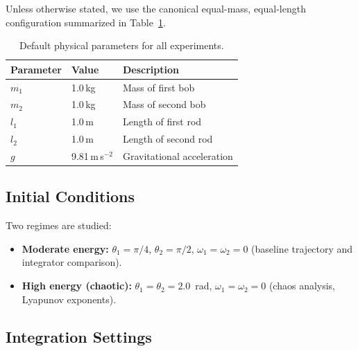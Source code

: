 \documentclass[11pt,a4paper]{article}
\begin{document}
Unless otherwise stated, we use the canonical equal-mass, equal-length
configuration summarized in Table~\ref{tab:params}.

\begin{table}[htbp]
\centering
\caption{Default physical parameters for all experiments.}
\label{tab:params}
\begin{tabular}{@{}lll@{}}
\toprule
\textbf{Parameter} & \textbf{Value} & \textbf{Description} \\
\midrule
$m_1$  & 1.0\,kg         & Mass of first bob \\
$m_2$  & 1.0\,kg         & Mass of second bob \\
$l_1$  & 1.0\,m          & Length of first rod \\
$l_2$  & 1.0\,m          & Length of second rod \\
$g$    & 9.81\,m\,s$^{-2}$ & Gravitational acceleration \\
\bottomrule
\end{tabular}
\end{table}

\subsection{Initial Conditions}

Two regimes are studied:
\begin{itemize}
  \item \textbf{Moderate energy:} $\theta_1 = \pi/4$, $\theta_2 = \pi/2$,
        $\omega_1 = \omega_2 = 0$ (baseline trajectory and integrator comparison).
  \item \textbf{High energy (chaotic):} $\theta_1 = \theta_2 = 2.0$~rad,
        $\omega_1 = \omega_2 = 0$ (chaos analysis, Lyapunov exponents).
\end{itemize}

\subsection{Integration Settings}
\end{document}
